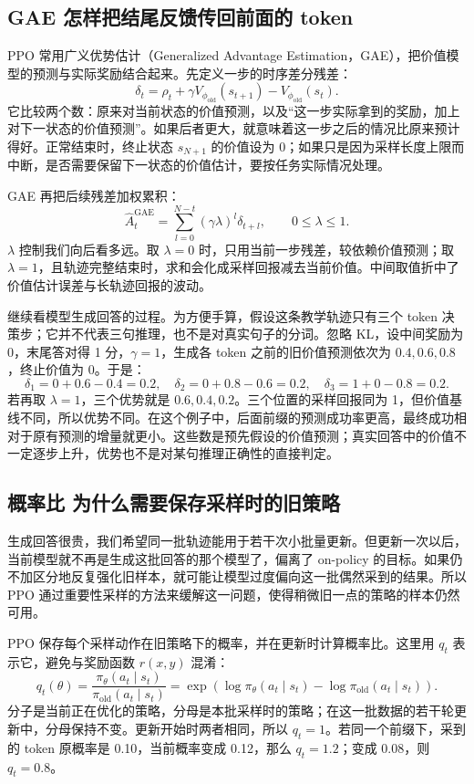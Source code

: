 \subsection{GAE 怎样把结尾反馈传回前面的 token}

PPO 常用广义优势估计（Generalized Advantage Estimation，GAE），把价值模型的预测与实际奖励结合起来。先定义一步的时序差分残差：
\[
    \delta_t=\rho_t+\gamma V_{\phi_{\mathrm{old}}}(s_{t+1})
                         -V_{\phi_{\mathrm{old}}}(s_t).
\]
它比较两个数：原来对当前状态的价值预测，以及``这一步实际拿到的奖励，加上对下一状态的价值预测''。如果后者更大，就意味着这一步之后的情况比原来预计得好。正常结束时，终止状态 $s_{N+1}$ 的价值设为 0；如果只是因为采样长度上限而中断，是否需要保留下一状态的价值估计，要按任务实际情况处理。

GAE 再把后续残差加权累积：
\[
    \widehat A_t^{\mathrm{GAE}}
      =\sum_{l=0}^{N-t}(\gamma\lambda)^l\delta_{t+l},
      \qquad 0\leq\lambda\leq 1.
\]
$\lambda$ 控制我们向后看多远。取 $\lambda=0$ 时，只用当前一步残差，较依赖价值预测；取 $\lambda=1$，且轨迹完整结束时，求和会化成采样回报减去当前价值。中间取值折中了价值估计误差与长轨迹回报的波动。

继续看模型生成回答的过程。为方便手算，假设这条教学轨迹只有三个 token 决策步；它并不代表三句推理，也不是对真实句子的分词。忽略 KL，设中间奖励为 0，末尾答对得 1 分，$\gamma=1$，生成各 token 之前的旧价值预测依次为 $0.4,0.6,0.8$，终止价值为 0。于是：
\[
    \delta_1=0+0.6-0.4=0.2,\quad
    \delta_2=0+0.8-0.6=0.2,\quad
    \delta_3=1+0-0.8=0.2.
\]
若再取 $\lambda=1$，三个优势就是 $0.6,0.4,0.2$。三个位置的采样回报同为 1，但价值基线不同，所以优势不同。在这个例子中，后面前缀的预测成功率更高，最终成功相对于原有预测的增量就更小。这些数是预先假设的价值预测；真实回答中的价值不一定逐步上升，优势也不是对某句推理正确性的直接判定。

\subsection{概率比 为什么需要保存采样时的旧策略}

生成回答很贵，我们希望同一批轨迹能用于若干次小批量更新。但更新一次以后，当前模型就不再是生成这批回答的那个模型了，偏离了 on-policy 的目标。如果仍不加区分地反复强化旧样本，就可能让模型过度偏向这一批偶然采到的结果。所以 PPO 通过重要性采样的方法来缓解这一问题，使得稍微旧一点的策略的样本仍然可用。

PPO 保存每个采样动作在旧策略下的概率，并在更新时计算概率比。这里用 $q_t$ 表示它，避免与奖励函数 $r(x,y)$ 混淆：
\[
    q_t(\theta)
      =\frac{\pi_\theta(a_t\mid s_t)}
                   {\pi_{\mathrm{old}}(a_t\mid s_t)}
      =\exp\left(\log\pi_\theta(a_t\mid s_t)
                 -\log\pi_{\mathrm{old}}(a_t\mid s_t)\right).
\]
分子是当前正在优化的策略，分母是本批采样时的策略；在这一批数据的若干轮更新中，分母保持不变。更新开始时两者相同，所以 $q_t=1$。若同一个前缀下，采到的 token 原概率是 0.10，当前概率变成 0.12，那么 $q_t=1.2$；变成 0.08，则 $q_t=0.8$。

